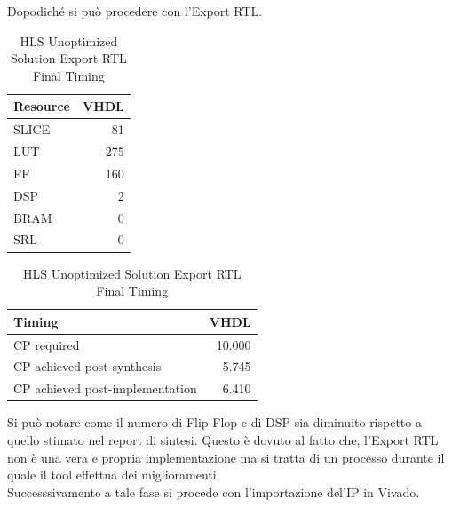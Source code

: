 Dopodiché si può procedere con l'Export RTL.
\begin{table}[H]
    \centering
    \begin{minipage}[t]{0.45\linewidth}
        \centering
        \begin{tabular}{|l|r|}
            \hline
            \textbf{Resource} & \textbf{VHDL} \\
            \hline
            SLICE & 81 \\
            \hline
            LUT & 275 \\
            \hline
            FF & 160 \\
            \hline
            DSP & 2 \\
            \hline
            BRAM & 0 \\
            \hline
            SRL & 0 \\
            \hline
        \end{tabular}
        \caption{HLS Unoptimized Solution Export RTL Resource Usage}
        \label{tab:hls-unoptimized-solution-export-rtl-resoruce-usage}
    \end{minipage}
    \hfill
    \begin{minipage}[t]{0.45\linewidth}
        \centering
        \begin{tabular}{|l|r|}
            \hline
            \textbf{Timing} & \textbf{VHDL} \\
            \hline
            CP required & 10.000 \\
            \hline
            CP achieved post-synthesis & 5.745 \\
            \hline
            CP achieved post-implementation & 6.410 \\
            \hline
        \end{tabular}
        \caption{HLS Unoptimized Solution Export RTL Final Timing}
        \label{tab:hls-unoptimized-solution-export-rtl-final-timing}
    \end{minipage}
\end{table}
Si può notare come il numero di Flip Flop e di DSP sia diminuito rispetto a quello stimato nel report di sintesi. Questo è dovuto al fatto che, l'Export RTL non è una vera e propria implementazione ma si tratta di un processo durante il quale il tool effettua dei miglioramenti. 
\\
Successsivamente a tale fase si procede con l'importazione del'IP in Vivado. 


